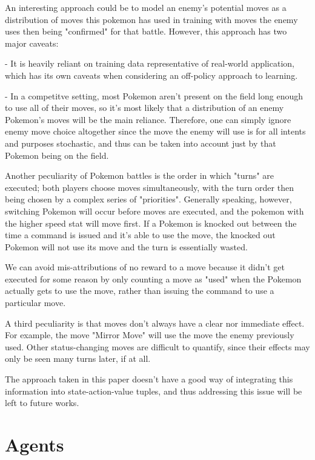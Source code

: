 \documentclass{article}
\begin{document}
\quad	An interesting approach could be to model an enemy's potential moves as a distribution of moves this pokemon has used in training with moves the enemy uses then being "confirmed" for that battle. However, this approach has two major caveats:

\quad	- It is heavily reliant on training data representative of real-world application, which has its own caveats when considering an off-policy approach to learning.

\quad	- In a competitve setting, most Pokemon aren't present on the field long enough to use all of their moves, so it's most likely that a distribution of an enemy Pokemon's moves will be the main reliance. Therefore, one can simply ignore enemy move choice altogether since the move the enemy will use is for all intents and purposes stochastic, and thus can be taken into account just by that Pokemon being on the field.

\quad	Another peculiarity of Pokemon battles is the order in which "turns" are executed; both players choose moves simultaneously, with the turn order then being chosen by a complex series of "priorities". Generally speaking, however, switching Pokemon will occur before moves are executed, and the pokemon with the higher speed stat will move first. If a Pokemon is knocked out between the time a command is issued and it's able to use the move, the knocked out Pokemon will not use its move and the turn is essentially wasted.

\quad	We can avoid mis-attributions of no reward to a move because it didn't get executed for some reason by only counting a move as "used" when the Pokemon actually gets to use the move, rather than issuing the command to use a particular move.

\quad	A third peculiarity is that moves don't always have a clear nor immediate effect. For example, the move "Mirror Move" will use the move the enemy previously used. Other status-changing moves are difficult to quantify, since their effects may only be seen many turns later, if at all.

\quad	The approach taken in this paper doesn't have a good way of integrating this information into state-action-value tuples, and thus addressing this issue will be left to future works.


\section{Agents}
\label{sec:agents}
\end{document}

